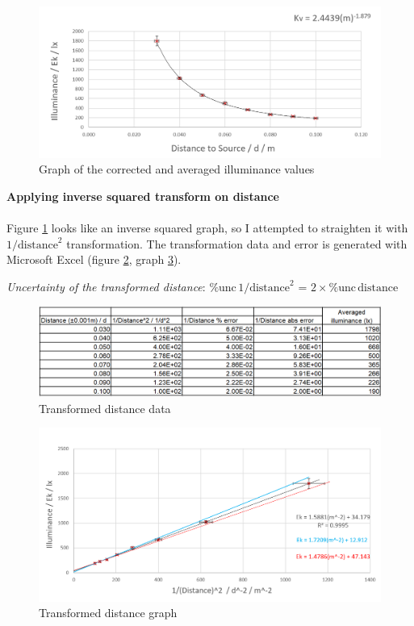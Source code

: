 \documentclass[a4paper,12pt]{article}
\newcommand{\relun}{\% \text{unc}\,}
\newcommand{\paragraphnl}[1]{\textbf{#1}\\\\}
\begin{document}
\begin{figure}[H]
    \centering
    \includegraphics[width=\textwidth]{assets/averagegraph.png}
    \caption{Graph of the corrected and averaged illuminance values}
    \label{gph:average}
\end{figure}


\paragraphnl{Applying inverse squared transform on distance}
Figure \ref{gph:average} looks like an inverse squared graph, so I attempted to straighten it with $1/{\text{distance}}^2$ transformation. The transformation data and error is generated with Microsoft Excel (figure \ref{fig:tdata}, graph \ref{gph:tdata}).

\textit{Uncertainty of the transformed distance}: $\relun 1/{\text{distance}}^2$ = $2 \times \relun \text{distance}$


\begin{figure}[H]
    \centering
    \includegraphics[width=\textwidth]{assets/transformdata.png}
    \caption{Transformed distance data}
    \label{fig:tdata}
\end{figure}

\begin{figure}[H]
    \centering
    \includegraphics[width=\textwidth]{assets/transformgraph.png}
    \caption{Transformed distance graph}
    \label{gph:tdata}
\end{figure}
\end{document}
